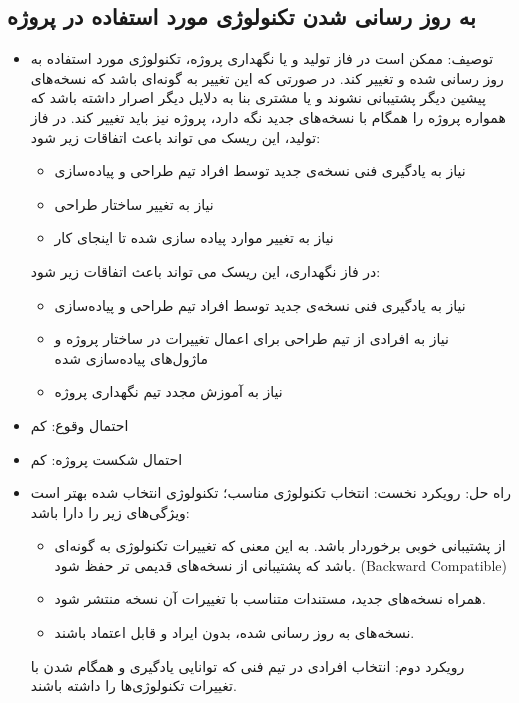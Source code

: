 \subsection{به روز رسانی شدن تکنولوژی مورد استفاده در پروژه}
\begin{itemize}
\item توصیف: ممکن است در فاز تولید و یا نگهداری پروژه، تکنولوژی مورد استفاده به روز رسانی شده و تغییر کند. در صورتی که این تغییر به گونه‌ای باشد که نسخه‌های پیشین دیگر پشتیبانی نشوند و یا مشتری بنا به دلایل دیگر اصرار داشته باشد که همواره پروژه را همگام با نسخه‌های جدید نگه دارد، پروژه نیز باید تغییر کند. در فاز تولید، این ریسک می تواند باعث اتفاقات زیر شود:
\begin{itemize}
\item نیاز به یادگیری فنی نسخه‌ی جدید توسط افراد تیم طراحی و پیاده‌سازی
\item نیاز به تغییر ساختار طراحی
\item  نیاز به تغییر موارد پیاده سازی شده تا اینجای کار
\end{itemize}
در فاز نگهداری، این ریسک می تواند باعث اتفاقات زیر شود:
\begin{itemize}
\item  نیاز به یادگیری فنی نسخه‌ی جدید توسط افراد تیم طراحی و پیاده‌سازی
\item نیاز به افرادی از تیم طراحی برای اعمال تغییرات در ساختار پروژه و ماژول‌های پیاده‌سازی شده
\item  نیاز به آموزش مجدد تیم نگهداری پروژه
\end{itemize}
\item احتمال وقوع: کم
\item احتمال شکست پروژه: کم
\item راه حل: رویکرد نخست: انتخاب تکنولوژی مناسب؛ تکنولوژی انتخاب شده بهتر است ویژگی‌های زیر را دارا باشد:
\begin{itemize}
\item از پشتیبانی خوبی برخوردار باشد. به این معنی که تغییرات تکنولوژی به گونه‌ای باشد که پشتیبانی از نسخه‌های قدیمی تر حفظ شود. (Backward Compatible)
\item  همراه نسخه‌های جدید، مستندات متناسب با تغییرات آن نسخه منتشر شود.
\item نسخه‌های به روز رسانی شده، بدون ایراد و قابل اعتماد باشند.
\end{itemize}
رویکرد دوم: انتخاب افرادی در تیم فنی که توانایی یادگیری و همگام شدن با تغییرات تکنولوژی‌ها را داشته باشند.
\end{itemize}